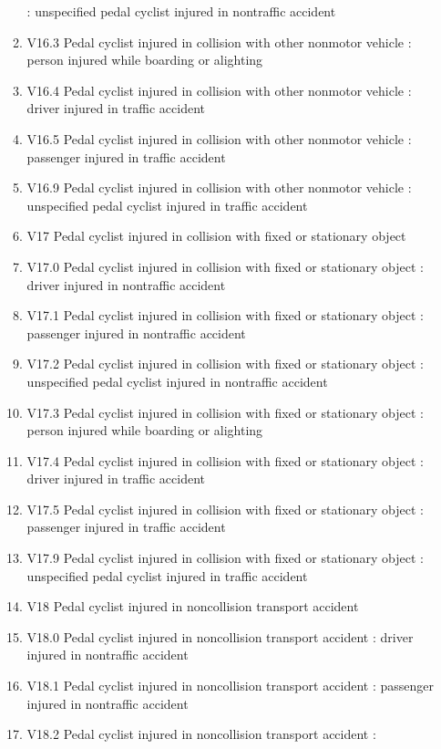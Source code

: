 \documentclass[
]{scrartcl}
\begin{document}
\begin{itemize}
\begin{enumerate}
    : unspecified pedal cyclist injured in nontraffic accident
  \item
    V16.3 Pedal cyclist injured in collision with other nonmotor vehicle
    : person injured while boarding or alighting
  \item
    V16.4 Pedal cyclist injured in collision with other nonmotor vehicle
    : driver injured in traffic accident
  \item
    V16.5 Pedal cyclist injured in collision with other nonmotor vehicle
    : passenger injured in traffic accident
  \item
    V16.9 Pedal cyclist injured in collision with other nonmotor vehicle
    : unspecified pedal cyclist injured in traffic accident
  \item
    V17 Pedal cyclist injured in collision with fixed or stationary
    object
  \item
    V17.0 Pedal cyclist injured in collision with fixed or stationary
    object : driver injured in nontraffic accident
  \item
    V17.1 Pedal cyclist injured in collision with fixed or stationary
    object : passenger injured in nontraffic accident
  \item
    V17.2 Pedal cyclist injured in collision with fixed or stationary
    object : unspecified pedal cyclist injured in nontraffic accident
  \item
    V17.3 Pedal cyclist injured in collision with fixed or stationary
    object : person injured while boarding or alighting
  \item
    V17.4 Pedal cyclist injured in collision with fixed or stationary
    object : driver injured in traffic accident
  \item
    V17.5 Pedal cyclist injured in collision with fixed or stationary
    object : passenger injured in traffic accident
  \item
    V17.9 Pedal cyclist injured in collision with fixed or stationary
    object : unspecified pedal cyclist injured in traffic accident
  \item
    V18 Pedal cyclist injured in noncollision transport accident
  \item
    V18.0 Pedal cyclist injured in noncollision transport accident :
    driver injured in nontraffic accident
  \item
    V18.1 Pedal cyclist injured in noncollision transport accident :
    passenger injured in nontraffic accident
  \item
    V18.2 Pedal cyclist injured in noncollision transport accident :

\end{enumerate}
\end{itemize}
\end{document}
